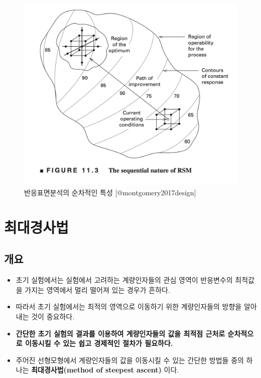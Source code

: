 \documentclass[
]{book}
\theoremstyle{definition}
\theoremstyle{definition}
\theoremstyle{definition}
\theoremstyle{definition}
\theoremstyle{remark}
\begin{document}
\begin{figure}

{\centering \includegraphics[width=0.8\linewidth]{myimages/response-02} 

}

\caption{반응표면분석의 순차적인 특성 [@montgomery2017design]}\label{fig:plot2}
\end{figure}

\hypertarget{steepdescent}{%
\chapter{최대경사법}\label{steepdescent}}

\hypertarget{uxac1cuxc694}{%
\section{개요}\label{uxac1cuxc694}}

\begin{itemize}
\item
  초기 실험에서는 실험에서 고려하는 계량인자들의 관심 영역이 반응변수의 최적값을 가지는 영역에서 멀리 떨어져 있는 경우가 흔하다.
\item
  따라서 초기 실험에서는 최적의 영역으로 이동하기 위한 계량인자들의 방향을 알아내는 것이 중요하다.
\item
  \textbf{간단한 초기 실험의 결과를 이용하여 계량인자들의 값을 최적점 근처로 순차적으로 이동시킬 수 있는 쉽고 경제적인 절차가 필요하다.}
\item
  주어진 선형모형에서 계량인자들의 값을 이동시킬 수 있는 간단한 방법들 중의 하나는 \textbf{최대경사법(method of steepest ascent)} 이다.
\end{itemize}
\end{document}
